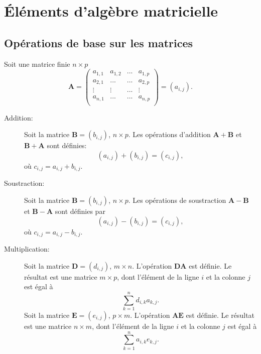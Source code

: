 \chapter{Éléments d'algèbre matricielle}
\label{chap:elements}

\section{Opérations de base sur les matrices}
\label{sec:elements:operations}
Soit une matrice finie $n\times p$ $$\mathbf{A}=\begin{pmatrix}a_{1,1} & a_{1,2} &... & a_{1,p} \\ a_{2,1} & ... & ... & a_{2,p}\\ \vdots & \vdots& ... & \vdots\\ a_{n,1} &...&...&a_{n,p}\\ \end{pmatrix}=(a_{i,j}).$$
\begin{description}
\item[Addition:] Soit la matrice $\mathbf{B}=(b_{i,j})$, $n\times p$. Les opérations d'addition $\mathbf{A+B}$ et $\mathbf{B+A}$ sont définies: $$(a_{i,j})+(b_{i,j})=(c_{i,j}),$$ où $c_{i,j}=a_{i,j}+b_{i,j}$.

\item[Soustraction:] Soit la matrice $\mathbf{B}=(b_{i,j})$, $n\times p$. Les opérations de soustraction $\mathbf{A-B}$ et $\mathbf{B-A}$ sont définies par
$$
(a_{i,j})-(b_{i,j})=(c_{i,j}),
$$ 
où $c_{i,j}=a_{i,j}-b_{i,j}$.

\item[Multiplication:] Soit la matrice $\mathbf{D}=(d_{i,j})$, $m\times n$. L'opération $\mathbf{DA}$ est définie. Le résultat est une matrice $m\times p$, dont l'élément de la ligne $i$ et la colonne $j$ est égal à 
$$
\sum_{k=1}^{n}d_{i,k}a_{k,j}.
$$ 
Soit la matrice $\mathbf{E}=(e_{i,j})$, $p\times m$. L'opération $\mathbf{AE}$ est définie. Le résultat est une matrice $n\times m$, dont l'élément de la ligne $i$ et la colonne $j$ est égal à 
$$
\sum_{k=1}^{n}a_{i,k}e_{k,j}.
$$
\end{description}

